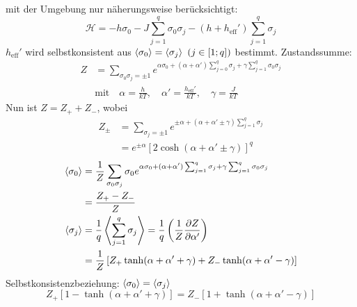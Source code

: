\begin{enumerate}[A)]
    mit der Umgebung nur näherungsweise berücksichtigt:
    \begin{equation}
        \mathscr{H} = - h \sigma_0 - J \sum_{j=1}^{q} \sigma_0 \sigma_j - \left( h + h_\text{eff}' \right) \sum_{j=1}^{q} \sigma_j
    \end{equation}
    $h_\text{eff}'$ wird selbstkonsistent aus $\left\langle\sigma_0\right\rangle = \left\langle\sigma_j\right\rangle \ (j \in \left[ 1; q \right])$ bestimmt. Zustandssumme:
    \begin{equation}
        \begin{split}
            Z &= \sum_{\sigma_0 \sigma_j = \pm 1} e^{\alpha \sigma_0 + (\alpha + \alpha') \sum_{j=0}^{q} \sigma_j + \gamma \sum_{j=1}^{q} \sigma_0 \sigma_j} \\
            & \text{mit}  \quad \alpha = \frac{h}{k T}, \quad \alpha' = \frac{h_\text{eff}'}{k T}, \quad \gamma = \frac{J}{k T}
        \end{split}
    \end{equation}
    Nun ist $Z = Z_+ + Z_-$, wobei
    \begin{equation}
        \begin{split}
            Z_\pm &= \sum_{\sigma_j = \pm 1} e^{\pm \alpha + (\alpha + \alpha' \pm \gamma) \sum_{j=1}^{q} \sigma_j} \\
            &= e^{\pm \alpha} \left[ 2 \cosh (\alpha + \alpha' \pm \gamma) \right]^q
        \end{split}
    \end{equation}
    \begin{equation}
        \begin{split}
            \left\langle\sigma_0\right\rangle &= \frac{1}{Z} \sum_{\sigma_0 \sigma_j} \sigma_0 e^{\alpha \sigma_0 + (\alpha + \alpha') \sum_{j=1}^{q} \sigma_j + \gamma \sum_{j=1}^{q} \sigma_0 \sigma_j} \\
            &= \frac{Z_+ - Z_-}{Z} \\
            \left\langle\sigma_j\right\rangle &= \frac{1}{q} \left\langle \sum_{j=1}^{q} \sigma_j\right\rangle = \frac{1}{q} \left( \frac{1}{Z} \frac{\partial Z}{\partial \alpha'} \right) \\
            &= \frac{1}{Z} \left[ Z_+ \tanh (\alpha + \alpha' + \gamma) + Z_- \tanh (\alpha + \alpha' - \gamma) \right]
        \end{split}
    \end{equation}
    Selbstkonsistenzbeziehung: $\left\langle\sigma_0\right\rangle = \left\langle\sigma_j\right\rangle$
    \begin{equation}
        Z_+ \left[ 1 - \tanh(\alpha + \alpha' + \gamma) \right] = Z_- \left[ 1 + \tanh (\alpha + \alpha' - \gamma) \right]

\end{equation}
\end{enumerate}
